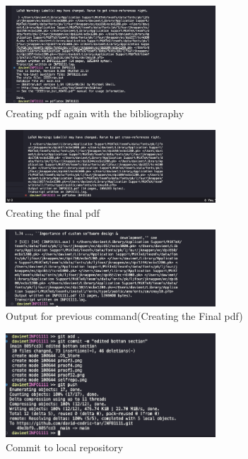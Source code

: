 \documentclass[a4paper, 11pt]{report}
\begin{document}
\begin{figure}[H]
    \centering
    \includegraphics[width=0.7\textwidth]{proof4}
    \caption{Creating pdf again with the bibliography}
\end{figure}

\begin{figure}[H]
    \centering
    \includegraphics[width=0.7\textwidth]{proof5}
    \caption{Creating the final pdf}
\end{figure}

\begin{figure}[H]
    \centering
    \includegraphics[width=0.7\textwidth]{proof52}
    \caption{Output for previous command(Creating the Final pdf)}
\end{figure}

\begin{figure}[H]
    \centering
    \includegraphics[width=0.7\textwidth]{proof6}
    \caption{Commit to local repository}
\end{figure}
\end{document}
